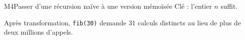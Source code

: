 \begin{fichemethode}{M4}{Passer d'une récursion naïve à une version mémoïsée}
Clé : l'entier $n$ suffit.

Après transformation, \lstinline{fib(30)} demande $31$ calculs distincts au lieu de plus de
deux millions d'appels.

%
%
%
%
%
%


\end{fichemethode}
